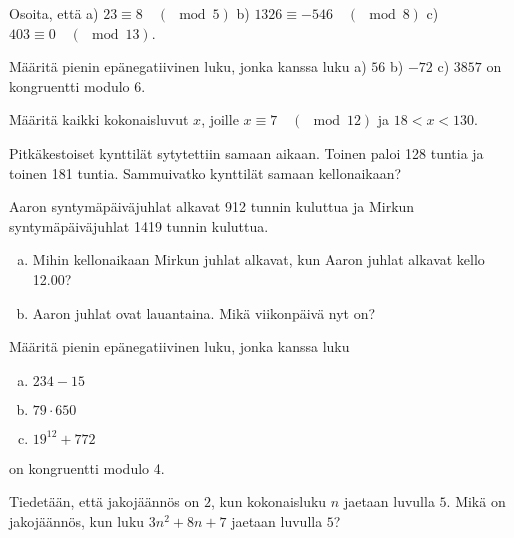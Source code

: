 \setcounter{tehtava}{0}

\begin{tehtavasivu}

\begin{tehtava}
	Osoita, että a) $23 \equiv 8 \quad (\mod 5)$ b) $1326 \equiv -546\quad (\mod 8)$ c) $403 \equiv 0 \quad (\mod 13)$.
\end{tehtava}

\begin{tehtava}
	Määritä pienin epänegatiivinen luku, jonka kanssa luku a) $56$ b) $-72$ c) $3857$ on kongruentti modulo $6$.
\end{tehtava}

\begin{tehtava}
	Määritä kaikki kokonaisluvut $x$, joille $x \equiv 7 \quad (\mod 12)$ ja $18 < x < 130$.
\end{tehtava}

\begin{tehtava}
	Pitkäkestoiset kynttilät sytytettiin samaan aikaan. Toinen paloi 128 tuntia ja toinen 181 tuntia. Sammuivatko kynttilät samaan kellonaikaan?
\end{tehtava}

\begin{tehtava}
	Aaron syntymäpäiväjuhlat alkavat 912 tunnin kuluttua ja Mirkun syntymäpäiväjuhlat 1419 tunnin kuluttua.
	\begin{enumerate}[a)]
	\item Mihin kellonaikaan Mirkun juhlat alkavat, kun Aaron juhlat alkavat kello 12.00?
	\item Aaron juhlat ovat lauantaina. Mikä viikonpäivä nyt on?
	\end{enumerate}
\end{tehtava}

\begin{tehtava}
	Määritä pienin epänegatiivinen luku, jonka kanssa luku
	\begin{enumerate}[a)]
	\item $234 - 15$
	\item $79 \cdot 650$
	\item $19^{12} + 772$
	\end{enumerate}
	on kongruentti modulo 4.
\end{tehtava}

\begin{tehtava}
	Tiedetään, että jakojäännös on $2$, kun kokonaisluku $n$ jaetaan luvulla $5$. Mikä on jakojäännös, kun luku $3n^2 + 8n + 7$ jaetaan luvulla $5$?
\end{tehtava}


\end{tehtavasivu}
